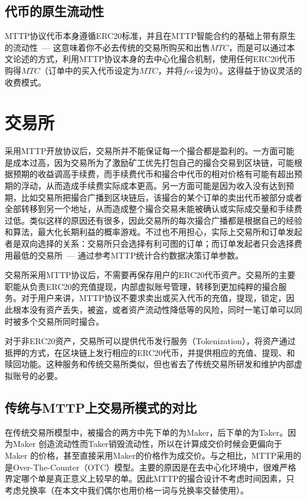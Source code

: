 \documentclass[UTF8,nofonts]{ctexart}
\begin{document}

\subsection{代币的原生流动性}

MTTP协议代币本身遵循ERC20标准，并且在MTTP智能合约的基础上带有原生的流动性\ --- 这意味着你不必去传统的交易所购买和出售$MTC$，而是可以通过本文论述的方式，利用MTTP协议本身的去中心化撮合机制，使用任何ERC20代币购得$MTC$（订单中的买入代币设定为$MTC$，并将$fee$设为0）。这得益于协议灵活的收费模式。


\section{交易所\label{sec:exchange}}

采用MTTP开放协议后，交易所并不能保证每一个撮合都是盈利的。一方面可能是成本过高，因为交易所为了激励矿工优先打包自己的撮合交易到区块链，可能根据预期的收益调高手续费，而手续费代币和撮合中代币的相对价格有可能有超出预期的浮动，从而造成手续费实际成本更高。另一方面可能是因为收入没有达到预期，比如交易所把撮合广播到区块链后，该撮合的某个订单的卖出代币被部分或者全部转移到另一个地址，从而造成整个撮合交易未能被确认或实际成交量和手续费过低。类似这样的原因还有很多，因此交易所的每次撮合广播都是根据自己的经验和算法，最大化长期利益的概率游戏。不过也不用担心，实际上交易所和订单发起者是双向选择的关系：交易所只会选择有利可图的订单；而订单发起者只会选择费用最低的交易所\ --- 通过参考MTTP统计合约数据决策订单参数。

交易所采用MTTP协议后，不需要再保存用户的ERC20代币资产。交易所的主要职能从负责ERC20的充值提现，内部虚拟账号管理，转移到更加纯粹的撮合服务。对于用户来讲，MTTP协议不要求卖出或买入代币的充值，提现，锁定，因此根本没有资产丢失，被盗，或者资产流动性降低等的风险，同时一笔订单可以同时被多个交易所同时撮合。

对于非ERC20资产，交易所可以提供代币发行服务（Tokenization），将资产通过抵押的方式，在区块链上发行相应的ERC20代币，并提供相应的充值、提现、和赎回功能。这种服务和传统交易所类似，但也省去了传统交易所研发和维护内部虚拟账号的必要。

\subsection{传统与MTTP上交易所模式的对比}
在传统交易所模型中，被撮合的两方中先下单的为Maker，后下单的为Taker。因为Maker 创造流动性而Taker销毁流动性，所以在计算成交价时候会更偏向于Maker 的价格，甚至直接采用Maker的价格作为成交价。与之相比，MTTP采用的是Over-The-Counter（OTC）模型。主要的原因是在去中心化环境中，很难严格界定哪个单是真正意义上较早的单。因此MTTP的撮合设计不考虑时间因素，只考虑兑换率（在本文中我们偶尔也用价格一词与兑换率交替使用）。
\end{document}
